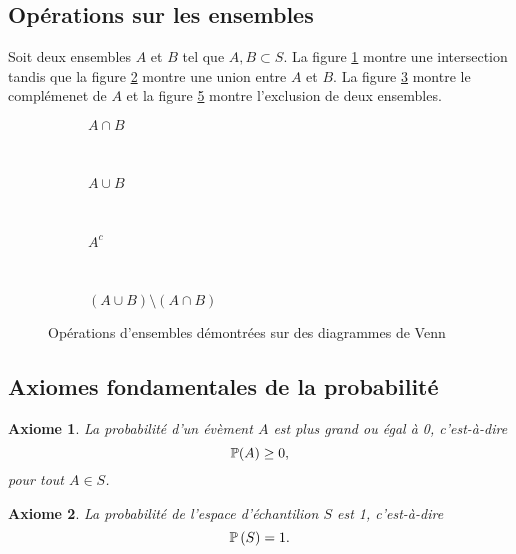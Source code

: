 \documentclass[11pt]{article}
\renewcommand\P{%
	\ensuremath{%
		\mathbb{P}%
	}%
}%
\newtheorem{axiome}{Axiome}
\begin{document}
\subsection{Opérations sur les ensembles}
Soit deux ensembles $A$ et $B$ tel que $A,B\subset S$. La figure
\ref{fig:venn_intersection} montre une intersection tandis que la figure
\ref{fig:venn_union} montre une union entre $A$ et $B$. La figure
\ref{fig:venn_complement} montre le complémenet de $A$ et la figure
\ref{fig:venn_exclusion} montre l'exclusion de deux ensembles.

\begin{figure}[H]
	\centering
	\begin{subfigure}[H]{0.21\textwidth}
		\centering
		
		\caption{$A\cap B$}
		\label{fig:venn_intersection}
	\end{subfigure}
	~
	\begin{subfigure}[H]{0.21\textwidth}
		\centering
		
		\caption{$A\cup B$}
		\label{fig:venn_union}
	\end{subfigure}
	~
	\begin{subfigure}[H]{0.21\textwidth}
		\centering
		
		\caption{$A^c$}
		\label{fig:venn_complement}
	\end{subfigure}
	~
	\begin{subfigure}[H]{0.21\textwidth}
		\centering
		
		\caption{$\left(A\cup B\right)\setminus\left(A\cap B\right)$}
		\label{fig:venn_exclusion}
	\end{subfigure}
	\caption{Opérations d'ensembles démontrées sur des diagrammes de Venn}
\end{figure}

\subsection{Axiomes fondamentales de la probabilité}
\begin{axiome}
	La probabilité d'un évèment $A$ est plus grand ou égal à 0, c'est-à-dire
	\begin{equation*}
		\P(A)\geq 0,
	\end{equation*}
	pour tout $A\in S$.
\end{axiome}

\begin{axiome}
	La probabilité de l'espace d'échantilion $S$ est 1, c'est-à-dire
	\begin{equation*}
		\P\left(S\right)=1.
	\end{equation*}
\end{axiome}
\end{document}
